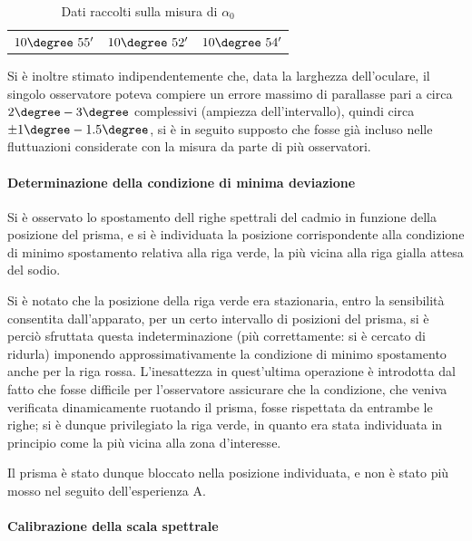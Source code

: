 \documentclass[a4paper,10pt]{article}
\begin{document}
\begin{table}[H]
	\centering
	\begin{tabular}{c|c|c}
		$10\degree~55'$  & $10\degree~52'$ & $10\degree~54'$\\
	\end{tabular}
\caption{Dati raccolti sulla misura di $\alpha_0$}
\end{table}
Si è inoltre stimato indipendentemente che, data la larghezza dell'oculare, il singolo osservatore poteva compiere un errore massimo di parallasse pari a circa $2\degree-3\degree$ complessivi (ampiezza dell'intervallo), quindi circa $\pm 1\degree-1.5\degree$, si è in seguito supposto che fosse già incluso nelle fluttuazioni considerate con la misura da parte di più osservatori.

\paragraph{Determinazione della condizione di minima deviazione} Si è osservato lo spostamento dell righe spettrali del cadmio in funzione della posizione del prisma, e si è individuata la posizione corrispondente alla condizione di minimo spostamento relativa alla riga verde, la più vicina alla riga gialla attesa del sodio.

Si è notato che la posizione della riga verde era stazionaria, entro la sensibilità consentita dall'apparato, per un certo intervallo di posizioni del prisma, si è perciò sfruttata questa indeterminazione (più correttamente: si è cercato di ridurla) imponendo approssimativamente la condizione di minimo spostamento anche per la riga rossa.
L'inesattezza in quest'ultima operazione è introdotta dal fatto che fosse difficile per l'osservatore assicurare che la condizione, che veniva verificata dinamicamente ruotando il prisma, fosse rispettata da entrambe le righe; si è dunque privilegiato la riga verde, in quanto era stata individuata in principio come la più vicina alla zona d'interesse.

Il prisma è stato dunque bloccato nella posizione individuata, e non è stato più mosso nel seguito dell'esperienza A.

\paragraph{Calibrazione della scala spettrale} 
\end{document}
